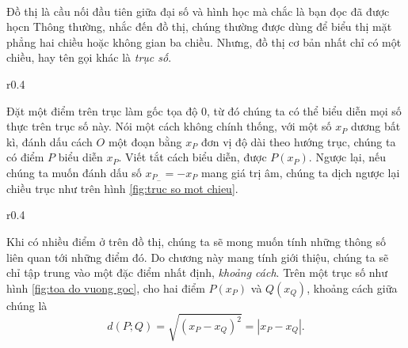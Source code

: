 \documentclass[a4paper, titlepage, openany]{book}
\begin{document}
\ %

Đồ thị là cầu nối đầu tiên giữa đại số và hình học mà chắc là bạn đọc đã được họcn Thông thường, nhắc đến đồ thị, chúng thường được dùng để biểu thị mặt phẳng hai chiều hoặc không gian ba chiều. Nhưng, đồ thị cơ bản nhất chỉ có một chiều, hay tên gọi khác là \emph{trục số}. 

\def \pointSize {1.5pt}

\begin{wrapfigure}{r}{0.4\textwidth}
   \centering
   \caption{Trục số một chiều}
   \label{fig:truc so mot chieu}
\end{wrapfigure}

Đặt một điểm trên trục làm gốc tọa độ $0$, từ đó chúng ta có thể biểu diễn mọi số thực trên trục số này. Nói một cách không chính thống, với một số $x_P$ dương bất kì, đánh dấu cách $O$ một đoạn bằng $x_P$ đơn vị độ dài theo hướng trục, chúng ta có điểm $P$ biểu diễn $x_P$. Viết tắt cách biểu diễn, được $P(x_P)$. Ngược lại, nếu chúng ta muốn đánh dấu số $x_{P_-}=-x_P$ mang giá trị âm, chúng ta dịch ngược lại chiều trục như trên hình \ref{fig:truc so mot chieu}.

\begin{wrapfigure}{r}{0.4\textwidth}
   \centering
   \caption{Khoảng cách trên trục số}
   \label{fig:truc so mot chieu}
\end{wrapfigure}

Khi có nhiều điểm ở trên đồ thị, chúng ta sẽ mong muốn tính những thông số liên quan tới những điểm đó. Do chương này mang tính giới thiệu, chúng ta sẽ chỉ tập trung vào một đặc điểm nhất định, \emph{khoảng cách}. Trên một trục số như hình \ref{fig:toa do vuong goc}, cho hai điểm $P(x_P)$ và $Q(x_Q)$, khoảng cách giữa chúng là $$d(P;Q)=\sqrt{(x_P-x_Q)^2}=|x_P-x_Q|.$$
\end{document}

